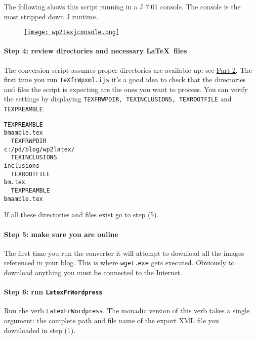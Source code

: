 The following shows this script running in a J 7.01 console. The console
is the most stripped down J runtime.
\begin{figure}[htbp]
\centering
\href{http://bakerjd99.files.wordpress.com/2012/02/wp2texjconsole.png}{\texttt{[image: wp2texjconsole.png]}}
\label{fig:2518X2}
\end{figure}

\paragraph{Step 4: review directories and necessary \LaTeX\ files}

The conversion script assumes proper directories are available up: see
\href{http://bakerjd99.wordpress.com/2012/02/18/wordpress-to-latex-with-pandoc-and-j-latex-directories-part-2-2/}{Part
2}. The first time you run \texttt{TeXfrWpxml.ijs} it's a good idea to
check that the directories and files the script is expecting are the
ones you want to process. You can verify the settings by displaying
\texttt{TEXFRWPDIR, TEXINCLUSIONS, TEXROOTFILE} and
\texttt{TEXPREAMBLE}.

\begin{lstlisting}[language=jdoc,frame=single,framerule=0pt,label=lst:scr2518X0]
  TEXPREAMBLE
bmamble.tex
  TEXFRWPDIR
c:/pd/blog/wp2latex/
  TEXINCLUSIONS
inclusions
  TEXROOTFILE
bm.tex
  TEXPREAMBLE
bmamble.tex
\end{lstlisting}

If all these directories and files exist go to step (5).

\paragraph{Step 5: make sure you are online}

The first time you run the converter it will attempt to download all the
images referenced in your blog. This is where \texttt{wget.exe} gets
executed. Obviously to download anything you must be connected to the
Internet.

\paragraph{Step 6: run \texttt{LatexFrWordpress}}

Run the verb \texttt{LatexFrWordpress}. The monadic version of this verb
takes a single argument: the complete path and file name of the export
XML file you downloaded in step (1).

